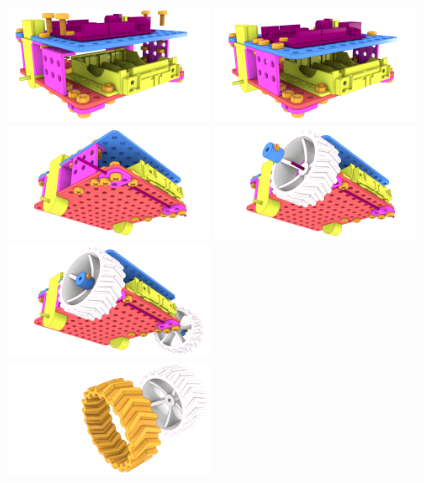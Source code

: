 \documentclass[twoside,a5paper,8pt]{article}
\begin{document}
  \includegraphics[height=30mm]{blender-render/render-instr/13-frame-block1-dev-view2.png}
  \includegraphics[height=30mm]{blender-render/render-instr/14-frame-block1-view2.png} \\
  \includegraphics[height=30mm]{blender-render/render-instr/15-frame-block2-dev1-view3.png}
  \includegraphics[height=30mm]{blender-render/render-instr/16-frame-block2-dev2-view3.png} \\
  \includegraphics[height=30mm]{blender-render/render-instr/17-frame-block2-view3.png} \\
  \includegraphics[height=30mm]{blender-render/render-instr/18-wheel-and-tyre-dev.png}
\end{document}
